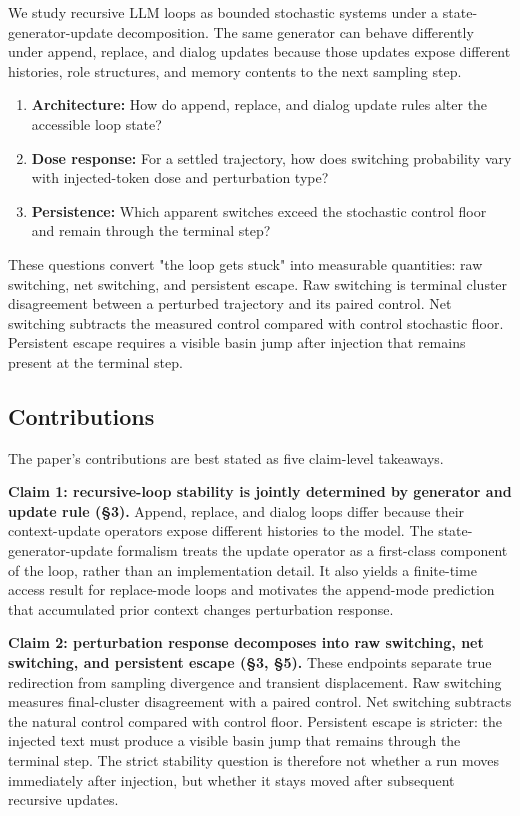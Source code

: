 \documentclass{article}
\theoremstyle{plain}
\theoremstyle{definition}
\begin{document}
We study recursive LLM loops as bounded stochastic systems under a state-generator-update decomposition. The same generator can behave differently under append, replace, and dialog updates because those updates expose different histories, role structures, and memory contents to the next sampling step.

\begin{enumerate}
  \item \textbf{Architecture:} How do append, replace, and dialog update rules alter the accessible loop state?
  \item \textbf{Dose response:} For a settled trajectory, how does switching probability vary with injected-token dose and perturbation type?
  \item \textbf{Persistence:} Which apparent switches exceed the stochastic control floor and remain through the terminal step?
\end{enumerate}

These questions convert "the loop gets stuck" into measurable quantities: raw switching, net switching, and persistent escape. Raw switching is terminal cluster disagreement between a perturbed trajectory and its paired control. Net switching subtracts the measured control compared with control stochastic floor. Persistent escape requires a visible basin jump after injection that remains present at the terminal step.

\subsection{Contributions}

The paper's contributions are best stated as five claim-level takeaways.

\textbf{Claim 1: recursive-loop stability is jointly determined by generator and update rule (§3).} Append, replace, and dialog loops differ because their context-update operators expose different histories to the model. The state-generator-update formalism treats the update operator as a first-class component of the loop, rather than an implementation detail. It also yields a finite-time access result for replace-mode loops and motivates the append-mode prediction that accumulated prior context changes perturbation response.

\textbf{Claim 2: perturbation response decomposes into raw switching, net switching, and persistent escape (§3, §5).} These endpoints separate true redirection from sampling divergence and transient displacement. Raw switching measures final-cluster disagreement with a paired control. Net switching subtracts the natural control compared with control floor. Persistent escape is stricter: the injected text must produce a visible basin jump that remains through the terminal step. The strict stability question is therefore not whether a run moves immediately after injection, but whether it stays moved after subsequent recursive updates.
\end{document}
